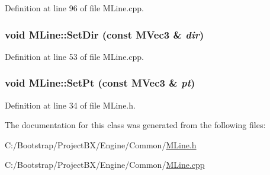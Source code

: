 Definition at line 96 of file MLine.cpp.\hypertarget{class_m_line_7b3fba942749f374c98ffee3472f7162}{
\subsubsection[{SetDir}]{\setlength{\rightskip}{0pt plus 5cm}void MLine::SetDir (const {\bf MVec3} \& {\em dir})}}
\label{class_m_line_7b3fba942749f374c98ffee3472f7162}




Definition at line 53 of file MLine.cpp.\hypertarget{class_m_line_a3f996dc4653721f464c47007d623370}{
\subsubsection[{SetPt}]{\setlength{\rightskip}{0pt plus 5cm}void MLine::SetPt (const {\bf MVec3} \& {\em pt})}}
\label{class_m_line_a3f996dc4653721f464c47007d623370}




Definition at line 34 of file MLine.h.

The documentation for this class was generated from the following files:\begin{CompactItemize}
\item 
C:/Bootstrap/ProjectBX/Engine/Common/\hyperlink{_m_line_8h}{MLine.h}\item 
C:/Bootstrap/ProjectBX/Engine/Common/\hyperlink{_m_line_8cpp}{MLine.cpp}\end{CompactItemize}
